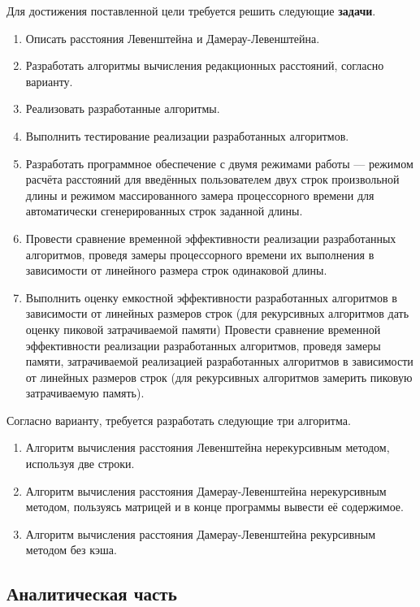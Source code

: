 \documentclass[12pt, a4paper]{article}
\begin{document}
Для достижения поставленной цели требуется решить следующие \textbf{задачи}.
\begin{enumerate}
\item Описать расстояния Левенштейна и Дамерау-Левенштейна.
\item Разработать алгоритмы вычисления редакционных расстояний, согласно варианту.
\item Реализовать разработанные алгоритмы.
\item Выполнить тестирование реализации разработанных алгоритмов.
\item Разработать программное обеспечение с двумя режимами работы --- режимом расчёта расстояний для введённых пользователем двух строк произвольной длины и режимом массированного замера процессорного времени для автоматически сгенерированных строк заданной длины.
\item Провести сравнение временной эффективности реализации разработанных алгоритмов, проведя замеры процессорного времени их выполнения в зависимости от линейного размера строк одинаковой длины.
\item Выполнить оценку емкостной эффективности разработанных алгоритмов в зависимости от линейных размеров строк (для рекурсивных алгоритмов дать оценку пиковой затрачиваемой памяти) Провести сравнение временной эффективности реализации разработанных алгоритмов, проведя замеры памяти, затрачиваемой реализацией разработанных алгоритмов в зависимости от линейных размеров строк (для рекурсивных алгоритмов замерить пиковую затрачиваемую память).
\end{enumerate}

Согласно варианту, требуется разработать следующие три алгоритма.
\begin{enumerate}
\item Алгоритм вычисления расстояния Левенштейна нерекурсивным методом, используя две строки.
\item Алгоритм вычисления расстояния Дамерау-Левенштейна нерекурсивным методом, пользуясь матрицей и в конце программы вывести её содержимое.
\item Алгоритм вычисления расстояния Дамерау-Левенштейна рекурсивным методом без кэша.
\end{enumerate}


\newpage
\begin{center}
   \section{Аналитическая часть} 
\end{center}
\end{document}
